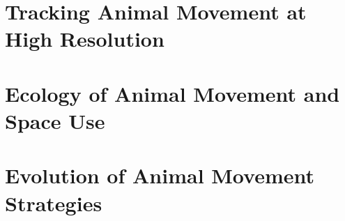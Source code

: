 \documentclass[ twoside,openright,titlepage,numbers=noenddot,%
                headinclude,footinclude,cleardoublepage=empty,abstract=on,
                BCOR=5mm,paper=b5,fontsize=10pt,dvipsnames
                ]{scrreprt}
\begin{document}
\part{Tracking Animal Movement at High Resolution}








\part{Ecology of Animal Movement and Space Use}









\part{Evolution of Animal Movement Strategies}







% 
% 



\appendix


\end{document}
